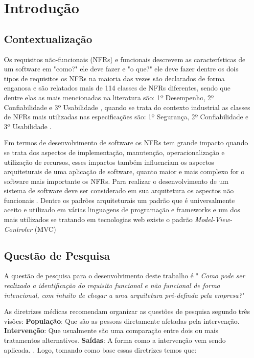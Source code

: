 \chapter{Introdução}

\section{Contextualização}

Os requisitos não-funcionais (NFRs) e funcionais descrevem as características de um software em "como?" ele deve fazer e "o que?" ele deve fazer \cite{sommerville1997requirements}  dentre os dois tipos de requisitos os NFRs na maioria das vezes são declarados de forma enganosa \cite{eckhardt2016non} e são relatados mais de 114 classes de NFRs diferentes, sendo que dentre elas as mais mencionadas na literatura são: 1º Desempenho, 2º Confiabilidade e  3º Usabilidade \cite{mairiza2010investigation}, quando se trata do contexto industrial as classes de NFRs mais utilizadas nas especificações são: 1º Segurança, 2º Confiabilidade e 3º Usabilidade \cite{eckhardt2016non}.

Em termos de desenvolvimento de software os NFRs tem grande impacto quando se trata dos aspectos de implementação, manutenção, operacionalização e utilização de recursos, esses impactos também influenciam os aspectos arquiteturais de uma aplicação de software, quanto maior e mais complexo for o software mais importante os NFRs. Para realizar o desenvolvimento de um sistema de software deve ser considerado em sua arquitetura os aspectos não funcionais \cite{buschmann1996system}. Dentre os padrões arquiteturais um padrão que é universalmente aceito e utilizado em várias linguagens de programação e frameworks e um dos mais utilizados se tratando em tecnologias web existe o padrão \textit{Model-View-Controler} (MVC) \cite{jailia2016behavior}

\section{Questão de Pesquisa}
A questão de pesquisa para o desenvolvimento deste trabalho é " \textit{Como pode ser realizado a identificação do requisito funcional e não funcional de forma intencional, com intuito de chegar a uma arquitetura pré-definda pela empresa?}"

As diretrizes médicas recomendam organizar as questões de pesquisa segundo três visões: \textbf{População}: Que são as pessoas diretamente afetadas pela intervenção. \textbf{Intervenção}: Que usualmente são uma comparação entre dois ou mais tratamentos alternativos. \textbf{Saídas}: A forma como a intervenção vem sendo aplicada. \cite{keele2007guidelines}. Logo, tomando como base essas diretrizes temos que: 

